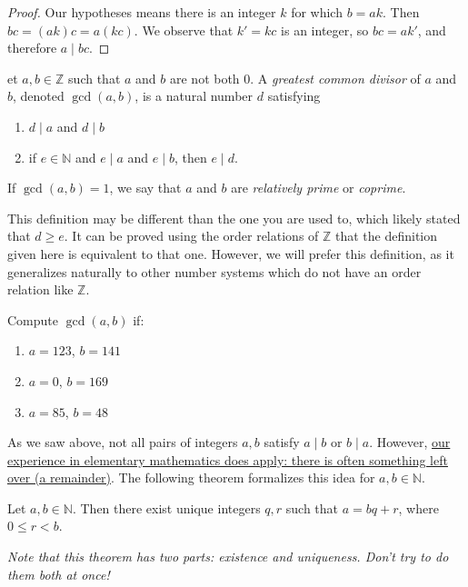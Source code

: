 \documentclass[english,course]{lecture}
\renewcommand{\le}{\leqslant}
\renewcommand{\ge}{\geqslant}
\theoremstyle{plain}
\newenvironment{definition}[1]
  {\renewcommand\theinnerdefinition{#1}\innerdefinition}
  {\endinnerdefinition}
\def\Z{{\mathbb Z}}
\def\N{{\mathbb N}}
\def\presnotes{}
\begin{document}
\begin{proof}
	Our hypotheses means there is an integer $k$ for which $b = ak$.
	Then $bc = (ak)c = a(kc)$.
	We observe that $k' = kc$ is an integer, so $bc = ak'$, and therefore $a\mid bc$.
\end{proof}

\presnotes

\begin{definition}
	Let $a,b\in \Z$ such that $a$ and $b$ are not both 0.
	A \emph{greatest common divisor} of $a$ and $b$, denoted $\gcd(a,b)$, is a natural number $d$ satisfying 
	\begin{enumerate}
		\item $d\mid a$ and $d\mid b$
		\item if $e\in \N$ and $e\mid a$ and $e\mid b$, then $e\mid d$.
	\end{enumerate}
	If $\gcd(a,b) = 1$, we say that $a$ and $b$ are \emph{relatively prime} or \emph{coprime}.
\end{definition}

This definition may be different than the one you are used to, which likely stated that $d \ge e$.
It can be proved using the order relations of $\Z$ that the definition given here is equivalent to that one.
However, we will prefer this definition, as it generalizes naturally to other number systems which do not have an order relation like $\Z$.

\begin{exer}
	Compute $\gcd(a,b)$ if:
	\begin{enumerate}
		\item $a = 123$, $b = 141$
		\item $a = 0$, $b = 169$
		\item $a= 85$, $b = 48$
	\end{enumerate}
\end{exer}

\presnotes

As we saw above, not all pairs of integers $a,b$ satisfy $a\mid b$ or $b\mid a$.
However, \href{http://www.corestandards.org/Math/Content/4/NBT/B/6/}{our experience in elementary mathematics does apply: there is often something left over (a remainder)}.
The following theorem formalizes this idea for $a,b\in \N$.

\begin{theorem}\label{thm:divalg}
	Let $a,b\in \N$.
	Then there exist unique integers $q,r$ such that $a = bq + r$, where $0 \le r < b$.
	
	\emph{Note that this theorem has two parts: existence and uniqueness. Don't try to do them both at once!}
\end{theorem}
\end{document}
